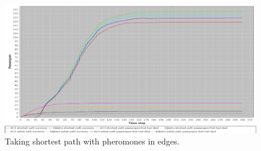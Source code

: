 \begin{figure} [float]
\centering
\hspace*{-1.0in}
\includegraphics[scale=0.35]{images/Graph-using-200-rounds-140-passangers-slow-fire.png}
\caption{Taking shortest path with pheromones in edges.}
\label{fig:celebSfire}
\end{figure}
